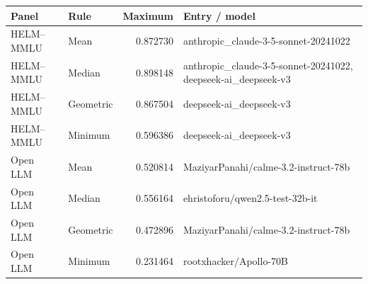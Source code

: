 \begin{tabular}{llrp{6.1cm}}
\toprule
Panel & Rule & Maximum & Entry / model \\
\midrule
HELM--MMLU & Mean & 0.872730 & anthropic\_claude-3-5-sonnet-20241022 \\
HELM--MMLU & Median & 0.898148 & anthropic\_claude-3-5-sonnet-20241022, deepseek-ai\_deepseek-v3 \\
HELM--MMLU & Geometric & 0.867504 & deepseek-ai\_deepseek-v3 \\
HELM--MMLU & Minimum & 0.596386 & deepseek-ai\_deepseek-v3 \\
Open LLM & Mean & 0.520814 & MaziyarPanahi/calme-3.2-instruct-78b \\
Open LLM & Median & 0.556164 & ehristoforu/qwen2.5-test-32b-it \\
Open LLM & Geometric & 0.472896 & MaziyarPanahi/calme-3.2-instruct-78b \\
Open LLM & Minimum & 0.231464 & rootxhacker/Apollo-70B \\
\bottomrule
\end{tabular}
